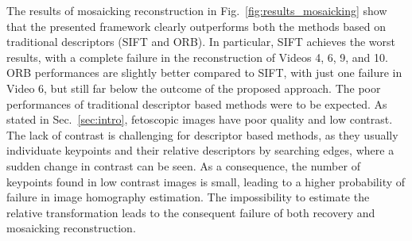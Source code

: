 \documentclass[sn-basic]{sn-jnl}%
\begin{document}
The results of mosaicking reconstruction in Fig.~\ref{fig:results_mosaicking} show that the presented framework clearly outperforms both the methods based on traditional descriptors (SIFT and ORB). In particular, SIFT achieves the worst results, with a complete failure in the reconstruction of Videos 4, 6, 9, and 10. ORB performances are slightly better compared to SIFT, with just one failure in Video 6, but still far below the outcome of the proposed approach. The poor performances of traditional descriptor based methods were to be expected. As stated in Sec.~\ref{sec:intro}, fetoscopic images have poor quality and low contrast. The lack of contrast is challenging for descriptor based methods, as they usually individuate keypoints and their relative descriptors by searching edges, where a sudden change in contrast can be seen. As a consequence, the number of keypoints found in low contrast images is small, leading to a higher probability of failure in image homography estimation. The impossibility to estimate the relative transformation leads to the consequent failure of both recovery and mosaicking reconstruction.

\end{document}
